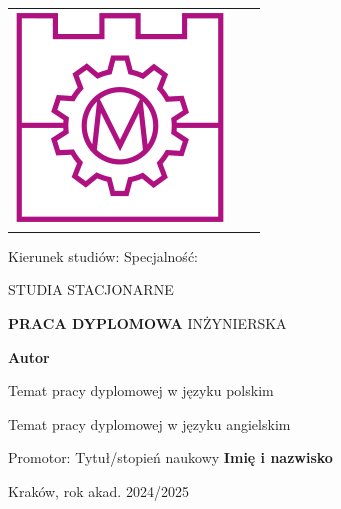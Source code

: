 \begin{titlepage}
\begin{center}
\begin{table}
\begin{tabular}{ccc}
\begin{minipage}{.1\textwidth}
            \includegraphics[width=1\linewidth]{media/logo-mech.png}
        \end{minipage}
        \\
        \end{tabular}
        \end{table}

    \begin{minipage}{12cm}
    \vspace*{1cm}
    \raggedright
        \large Kierunek studiów: \break
        \large Specjalność: \break
    \end{minipage}
    \vspace*{1cm}

    \large STUDIA STACJONARNE
    \vspace*{1cm}
    
    \textbf{\Huge PRACA DYPLOMOWA} \break
    \LARGE INŻYNIERSKA
            
    \vspace{1.5cm}

    \textbf{\Large Autor}

    \vspace{1.5cm}

    \large Temat pracy dyplomowej w języku polskim \break 

    Temat pracy dyplomowej w języku angielskim

    \vspace*{1.5cm}

    Promotor: \break
    Tytuł/stopień naukowy \textbf{Imię i nazwisko}
    \vfill

    Kraków, rok akad. 2024/2025

    \vspace{1cm}
    
            
   \end{center}
\end{titlepage}